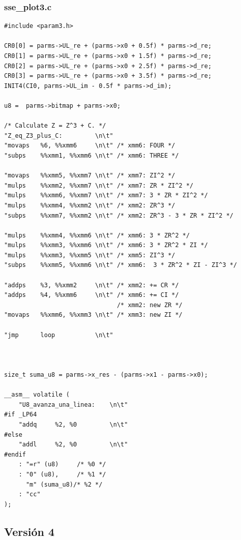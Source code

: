 \documentclass[a4paper,10pt]{article}
\begin{document}
\subsubsection{sse\_plot3.c}
\begin{verbatim}
#include <param3.h>

CR0[0] = parms->UL_re + (parms->x0 + 0.5f) * parms->d_re;
CR0[1] = parms->UL_re + (parms->x0 + 1.5f) * parms->d_re;
CR0[2] = parms->UL_re + (parms->x0 + 2.5f) * parms->d_re;
CR0[3] = parms->UL_re + (parms->x0 + 3.5f) * parms->d_re;
INIT4(CI0, parms->UL_im - 0.5f * parms->d_im);

u8 =  parms->bitmap + parms->x0;

/* Calculate Z = Z^3 + C. */
"Z_eq_Z3_plus_C:         \n\t"
"movaps   %6, %%xmm6     \n\t" /* xmm6: FOUR */
"subps    %%xmm1, %%xmm6 \n\t" /* xmm6: THREE */

"movaps   %%xmm5, %%xmm7 \n\t" /* xmm7: ZI^2 */
"mulps    %%xmm2, %%xmm7 \n\t" /* xmm7: ZR * ZI^2 */
"mulps    %%xmm6, %%xmm7 \n\t" /* xmm7: 3 * ZR * ZI^2 */
"mulps    %%xmm4, %%xmm2 \n\t" /* xmm2: ZR^3 */
"subps    %%xmm7, %%xmm2 \n\t" /* xmm2: ZR^3 - 3 * ZR * ZI^2 */

"mulps    %%xmm4, %%xmm6 \n\t" /* xmm6: 3 * ZR^2 */
"mulps    %%xmm3, %%xmm6 \n\t" /* xmm6: 3 * ZR^2 * ZI */
"mulps    %%xmm3, %%xmm5 \n\t" /* xmm5: ZI^3 */
"subps    %%xmm5, %%xmm6 \n\t" /* xmm6:  3 * ZR^2 * ZI - ZI^3 */

"addps    %3, %%xmm2     \n\t" /* xmm2: += CR */
"addps    %4, %%xmm6     \n\t" /* xmm6: += CI */
							   /* xmm2: new ZR */
"movaps   %%xmm6, %%xmm3 \n\t" /* xmm3: new ZI */

"jmp      loop           \n\t"



size_t suma_u8 = parms->x_res - (parms->x1 - parms->x0);
		
__asm__ volatile (
	"U8_avanza_una_linea:    \n\t"
#if _LP64
	"addq     %2, %0         \n\t"
#else
	"addl     %2, %0         \n\t"
#endif		
	: "=r" (u8)		/* %0 */
	: "0" (u8),		/* %1 */
	  "m" (suma_u8)/* %2 */
	: "cc"
);

\end{verbatim}

\subsection{Versión 4}
\end{document}
